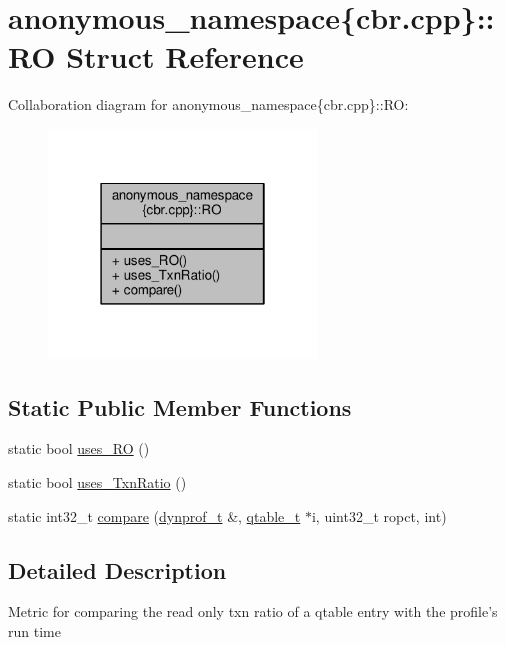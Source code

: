 \hypertarget{structanonymous__namespace_02cbr_8cpp_03_1_1RO}{\section{anonymous\-\_\-namespace\{cbr.\-cpp\}\-:\-:R\-O Struct Reference}
\label{structanonymous__namespace_02cbr_8cpp_03_1_1RO}
}


Collaboration diagram for anonymous\-\_\-namespace\{cbr.\-cpp\}\-:\-:R\-O\-:
\nopagebreak
\begin{figure}[H]
\begin{center}
\leavevmode
\includegraphics[width=202pt]{structanonymous__namespace_02cbr_8cpp_03_1_1RO__coll__graph}
\end{center}
\end{figure}
\subsection*{Static Public Member Functions}
\begin{DoxyCompactItemize}
\item 
static bool \hyperlink{structanonymous__namespace_02cbr_8cpp_03_1_1RO_a8eaf4f77c963207bdb7230391ddef4a9}{uses\-\_\-\-R\-O} ()
\item 
static bool \hyperlink{structanonymous__namespace_02cbr_8cpp_03_1_1RO_a75111d666a616355c8f77e9a00af8436}{uses\-\_\-\-Txn\-Ratio} ()
\item 
static int32\-\_\-t \hyperlink{structanonymous__namespace_02cbr_8cpp_03_1_1RO_a4c11774c09c28b9ca702016d147222a5}{compare} (\hyperlink{structstm_1_1dynprof__t}{dynprof\-\_\-t} \&, \hyperlink{structstm_1_1qtable__t}{qtable\-\_\-t} $\ast$i, uint32\-\_\-t ropct, int)
\end{DoxyCompactItemize}


\subsection{Detailed Description}
Metric for comparing the read only txn ratio of a qtable entry with the profile's run time 

